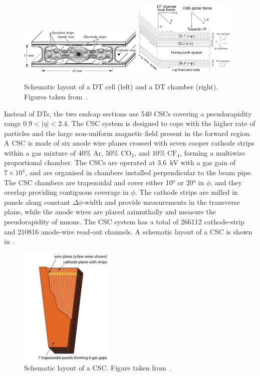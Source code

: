 \begin{figure}[!htbp]
 \centering
 \includegraphics[width=0.53\textwidth]{Figures/Experiment/CMS/DT_2.png}
 \includegraphics[width=0.43\textwidth]{Figures/Experiment/CMS/DT_1.png}
 \caption{Schematic layout of a DT cell (left) and a DT chamber (right). Figures taken from~\cite{CMSMuonDTFig}.}
 \label{fig:CMS_DT}
\end{figure}

Instead of DTs, the two endcap sections use 540 CSCs covering a pseudorapidity range $0.9 < |\eta| < 2.4$. The CSC system is designed to cope with the higher rate of particles and the large non-uniform magnetic field present in the forward region. A CSC is made of six anode wire planes crossed with seven cooper cathode strips within a gas mixture of $40\%$ Ar, $50\%$ $\text{CO}_{2}$, and $10\%$ $\text{CF}_{4}$, forming a multiwire proportional chamber. The CSCs are operated at \SI{3.6}{\kV} with a gas gain of $7{\times}10^{4}$, and are organised in chambers installed perpendicular to the beam pipe. The CSC chambers are trapezoidal and cover either \ang{10} or \ang{20} in $\phi$, and they overlap providing contiguous coverage in $\phi$. The cathode strips are milled in panels along constant $\Delta{\phi}$-width and provide measurements in the transverse plane, while the anode wires are placed azimuthally and measure the pseudorapidity of muons. The CSC system has a total of 266112 cathode-strip and 210816 anode-wire read-out channels. A schematic layout of a CSC is shown in .

\begin{figure}[!htbp]
 \centering
 \includegraphics[width=0.4\textwidth]{Figures/Experiment/CMS/CSC.png}
 \caption{Schematic layout of a CSC. Figure taken from~\cite{CMS}.}
 \label{fig:CMS_CSC}
\end{figure}

